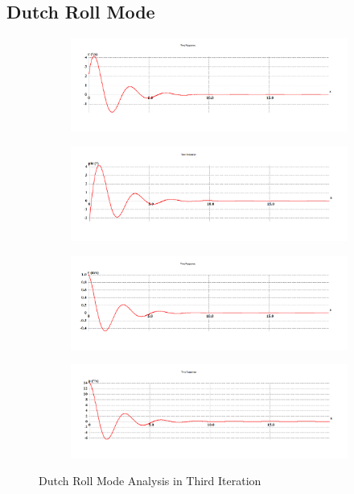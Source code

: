 \subsection{Dutch Roll Mode}
\begin{figure}[H]
\begin{subfigure}{0.48\textwidth}
\includegraphics[width = \linewidth]{r (2).png}
\end{subfigure}
\begin{subfigure}{0.48\textwidth}
\includegraphics[width = \linewidth]{phi (2).png}
\end{subfigure}
\medskip
\begin{subfigure}{0.48\textwidth}
\includegraphics[width = \linewidth]{v (2).png}
\end{subfigure}
\begin{subfigure}{0.48\textwidth}
\includegraphics[width = \linewidth]{p (2).png}
\end{subfigure}
\caption{Dutch Roll Mode Analysis in Third Iteration}
\end{figure}
